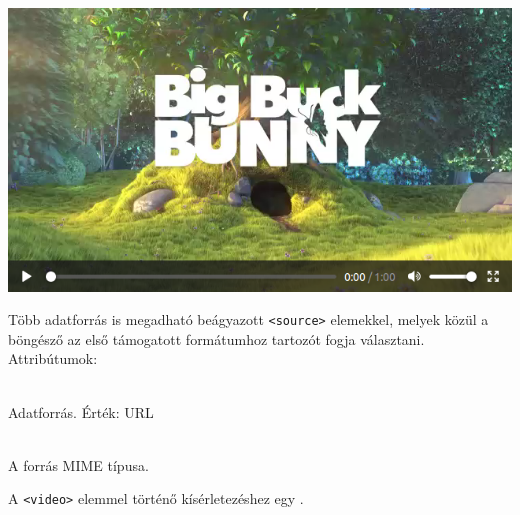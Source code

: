\begin{frame}
  \begin{exampleblock}{}
    \footnotesize
    
  \end{exampleblock}
    \begin{center}
    \includegraphics[scale=.2]{video1.png}
  \end{center}
\end{frame}

\begin{frame}
  Több adatforrás is megadható beágyazott \texttt{<source>} elemekkel, melyek 
  közül a böngésző az első támogatott formátumhoz tartozót 
  fogja választani. Attribútumok:
  \begin{description}[m]
    \item[\texttt{<src>}] \hfill \\ Adatforrás. Érték: URL
    \item[\texttt{<type>}] \hfill \\ A forrás MIME típusa.
  \end{description}
  A \texttt{<video>} elemmel történő kísérletezéshez egy 
  .
\end{frame}

\begin{frame}
  \begin{exampleblock}{}
    \scriptsize
    
  \end{exampleblock}
\end{frame}

